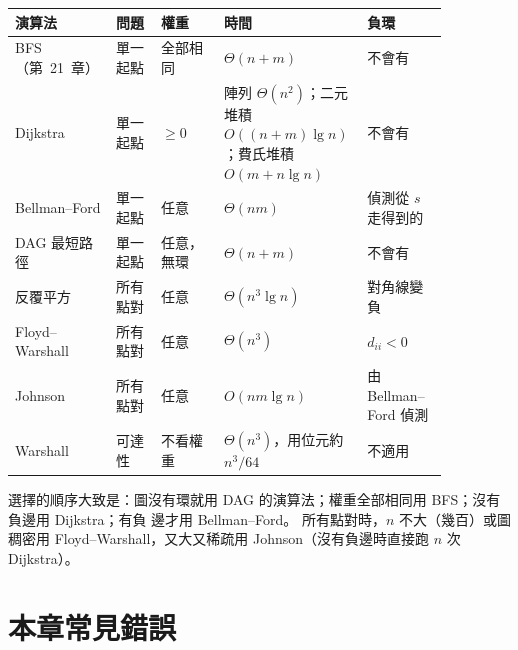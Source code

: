 \begin{center}
\small
\begin{tabular}{>{\raggedright\arraybackslash}p{0.17\linewidth}>{\raggedright\arraybackslash}p{0.10\linewidth}>{\raggedright\arraybackslash}p{0.14\linewidth}>{\raggedright\arraybackslash}p{0.27\linewidth}>{\raggedright\arraybackslash}p{0.18\linewidth}}
\toprule
演算法 & 問題 & 權重 & 時間 & 負環 \\
\midrule
BFS（第~21~章） & 單一起點 & 全部相同 & $\Theta(n + m)$ & 不會有 \\
Dijkstra & 單一起點 & $\ge 0$ & 陣列 $\Theta(n^2)$；二元堆積 $O((n + m) \lg n)$；費氏堆積 $O(m + n \lg n)$ & 不會有 \\
Bellman--Ford & 單一起點 & 任意 & $\Theta(nm)$ & 偵測從 $s$ 走得到的 \\
DAG 最短路徑 & 單一起點 & 任意，無環 & $\Theta(n + m)$ & 不會有 \\
反覆平方 & 所有點對 & 任意 & $\Theta(n^3 \lg n)$ & 對角線變負 \\
Floyd--Warshall & 所有點對 & 任意 & $\Theta(n^3)$ & $d_{ii} < 0$ \\
Johnson & 所有點對 & 任意 & $O(nm \lg n)$ & 由 Bellman--Ford 偵測 \\
Warshall & 可達性 & 不看權重 & $\Theta(n^3)$，用位元約 $n^3/64$ & 不適用 \\
\bottomrule
\end{tabular}
\end{center}

選擇的順序大致是：圖沒有環就用 DAG 的演算法；權重全部相同用 BFS；沒有負邊用 Dijkstra；有負
邊才用 Bellman--Ford。 所有點對時，$n$ 不大（幾百）或圖稠密用 Floyd--Warshall，又大又稀疏用
Johnson（沒有負邊時直接跑 $n$ 次 Dijkstra）。

\section{本章常見錯誤}
\label{sec:spt-pitfalls}

